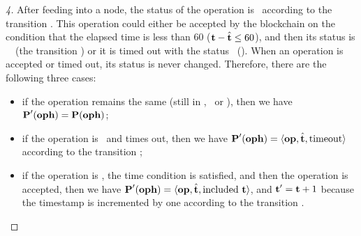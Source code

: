 \documentclass[runningheads]{llncs}
\begin{document}
\begin{proof}[4]
 After feeding into a node, the status of the operation is \STATUSPENDING\ according to the transition . This operation could either be accepted by the blockchain on the condition that the elapsed time is less than 60 ($\textbf{t} - \hat{\textbf{t}} \le 60$), and then its status is \STATUSINCLUDED\ \TIME \ (the transition ) or it is timed out with the status \STATUSTIMEOUT\ (). When an operation is accepted or timed out, its status is never changed. Therefore, there are the following three cases:
 
 \begin{itemize}
 \item if the operation remains the same (still in \STATUSPENDING, \STATUSINCLUDED\ or \STATUSTIMEOUT), then we have $\textbf{P}' (\textbf{oph}) = \textbf{P} (\textbf{oph})$; 
 \item if the operation is \STATUSPENDING\ and times out, then we have $\textbf{P}' (\textbf{oph}) = \langle\textbf{op}, \hat{\textbf{t}}, \text{timeout}\rangle$ according to the transition ; 
 \item if the operation is \STATUSPENDING, the time condition is satisfied, and then the operation is accepted, then we have $\textbf{P}' (\textbf{oph}) = \langle\textbf{op}, \hat{\textbf{t}}, \text{included}\ \textbf{t} \rangle$, and $\textbf{t}'=\textbf{t} +1$ because the timestamp is incremented by one according to the transition .
 \end{itemize}

\end{proof}
\end{document}
